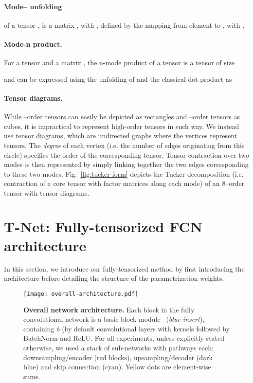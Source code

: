 \documentclass[10pt,twocolumn,letterpaper]{article}
\begin{document}
\paragraph{Mode-- unfolding} of a tensor
	,
	is a matrix , 
	with ,
	defined by the mapping from element
	 to , with 
	.
	

\paragraph{Mode-n product.}
For a tensor  and a matrix , the n-mode product of a tensor 
	is a tensor of size 
	 
	and can be expressed using the unfolding of  
	and the classical dot product as 


\paragraph{Tensor diagrams.} While --order tensors can easily be depicted as rectangles and --order tensors as cubes, it is impractical to represent high-order tensors in such way. We instead use tensor diagrams, which are undirected graphs where the vertices represent tensors. The \emph{degree} of each vertex (i.e. the number of edges originating from this circle) specifies the order of the corresponding tensor. Tensor contraction over two modes is then represented by simply linking together the two edges corresponding to these two modes. Fig.~\ref{fig:tucker-form} depicts the Tucker decomposition (i.e. contraction of a core tensor with factor matrices along each mode) of an 8\myth--order tensor with tensor diagrams.
 \section{T-Net: Fully-tensorized FCN architecture}\label{sec:method}

In this section, we introduce our fully-tensorized method by first introducing the architecture before detailing the structure of the parametrization weights.
\begin{figure*}
    \centering
    \texttt{[image: overall-architecture.pdf]}
    \caption{\textbf{Overall network architecture.} Each block in the fully convolutional network is a basic-block module~\cite{he2016deep} (\emph{blue insert}), containing \emph{b} (by default  convolutional layers with  kernels followed by BatchNorm and ReLU. For all experiments, unless explicitly stated otherwise, we used a stack of  sub-networks with  pathways each: downsampling/encoder (red blocks), upsampling/decoder (dark blue) and skip connection (cyan). Yellow dots are element-wise sums.}
    \label{fig:overall-architecture}
\end{figure*}
\end{document}
